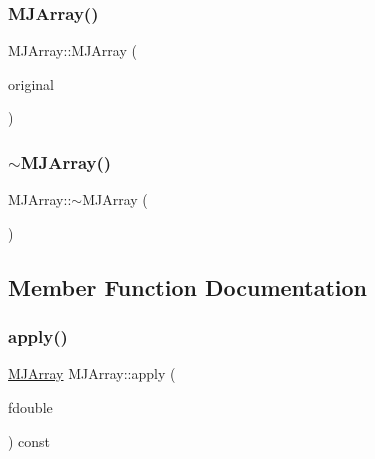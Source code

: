 \hypertarget{classMJArray_abc20a4af4285b9cc1b53ef1c9455f7b4}{}\label{classMJArray_abc20a4af4285b9cc1b53ef1c9455f7b4} 
\subsubsection{\texorpdfstring{M\+J\+Array()}{MJArray()}\hspace{0.1cm}{\footnotesize\ttfamily [2/2]}}
{\footnotesize\ttfamily M\+J\+Array\+::\+M\+J\+Array (\begin{DoxyParamCaption}\item[{const \hyperlink{classMJArray}{M\+J\+Array} \&}]{original }\end{DoxyParamCaption})}

\hypertarget{classMJArray_a7e3ed3537c34e7643a920069862bc4fa}{}\label{classMJArray_a7e3ed3537c34e7643a920069862bc4fa} 
\subsubsection{\texorpdfstring{$\sim$\+M\+J\+Array()}{~MJArray()}}
{\footnotesize\ttfamily M\+J\+Array\+::$\sim$\+M\+J\+Array (\begin{DoxyParamCaption}{ }\end{DoxyParamCaption})}



\subsection{Member Function Documentation}
\hypertarget{classMJArray_a7564d3a887e8635f0430263839dfc602}{}\label{classMJArray_a7564d3a887e8635f0430263839dfc602} 
\subsubsection{\texorpdfstring{apply()}{apply()}}
{\footnotesize\ttfamily \hyperlink{classMJArray}{M\+J\+Array} M\+J\+Array\+::apply (\begin{DoxyParamCaption}\item[{double }]{fdouble }\end{DoxyParamCaption}) const}

\hypertarget{classMJArray_ad96b5b1988e216bece33f8cad1907ebb}{}\label{classMJArray_ad96b5b1988e216bece33f8cad1907ebb} 
